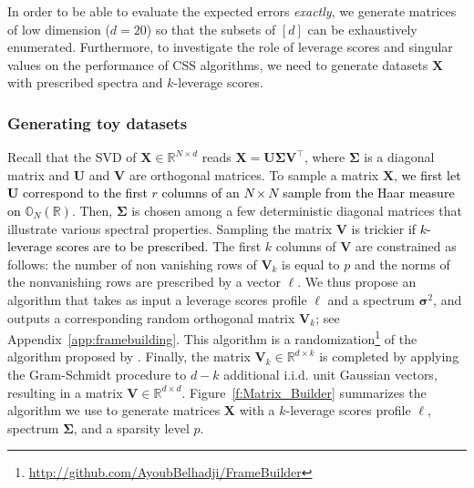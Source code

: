 \documentclass[twoside,11pt]{book}
\newcommand{\rev}[1]{\textcolor{black}{#1}}
\numberwithin{theorem}{chapter}
\numberwithin{definition}{chapter}
\numberwithin{proposition}{chapter}
\numberwithin{corollary}{chapter}
\numberwithin{example}{chapter}
\numberwithin{lemma}{chapter}
\numberwithin{assumption}{chapter}
\numberwithin{equation}{chapter}
\numberwithin{figure}{chapter}
\DeclareMathOperator{\Tran}{\intercal}
\newcommand{\rb}[1]{\textcolor{magenta}{#1}}
\begin{document}
In order to be able to evaluate the expected errors \emph{exactly}, we generate matrices of low dimension ($d = 20$) so that the subsets of $[d]$ can be exhaustively enumerated. Furthermore, to investigate the role of leverage scores and singular values on the performance of CSS algorithms, we need to generate datasets $\bm{X}$ with prescribed spectra and $k$-leverage scores.

\subsubsection{Generating toy datasets}
Recall that the SVD of $\bm{X}\in\mathbb{R}^{N\times d}$ reads $\bm{X} = \bm{U}\bm{\Sigma}\bm{V}^{\Tran}$, where $\bm{\Sigma}$ is a diagonal matrix and $\bm{U}$ and $\bm{V}$ are orthogonal matrices. To sample a matrix $\bm{X}$, \rev{we first let $\bm{U}$ correspond to the first $r$ columns of an $N \times N$ sample from the Haar measure on $\mathbb{O}_{N}(\mathbb{R})$}. Then, $\bm{\Sigma}$ is chosen among a few deterministic diagonal matrices that illustrate various spectral properties. Sampling the matrix $\bm{V}$ is trickier \rev{if $k$-leverage scores are to be prescribed}. The first $k$ columns of $\bm{V}$ are constrained as follows: the number of non vanishing rows of $\bm{V}_{k}$ is equal to $p$ and the norms of the nonvanishing rows are prescribed by a vector $\bm{\ell}$.
We thus propose an algorithm that takes as input a leverage scores profile $\bm{\ell}$ and a spectrum $\bm{\sigma}^2$, and outputs a corresponding random orthogonal matrix $\bm{V}_k$; see Appendix~\ref{app:framebuilding}. This algorithm is a randomization\footnote{\url{http://github.com/AyoubBelhadji/FrameBuilder}} of the algorithm proposed by \cite*{FMPS13}.  Finally, the matrix $\bm{V}_{k} \in \mathbb{R}^{d \times k}$ is completed by applying the Gram-Schmidt procedure to $d-k$ additional i.i.d. unit Gaussian vectors, resulting in a matrix $\bm{V} \in \mathbb{R}^{d \times d}$. Figure~\ref{f:Matrix_Builder} summarizes the algorithm we use to generate matrices $\bm{X}$ with a $k$-leverage scores profile $\bm{\ell}$, spectrum $\bm{\Sigma}$, and a sparsity level $p$.
\end{document}
